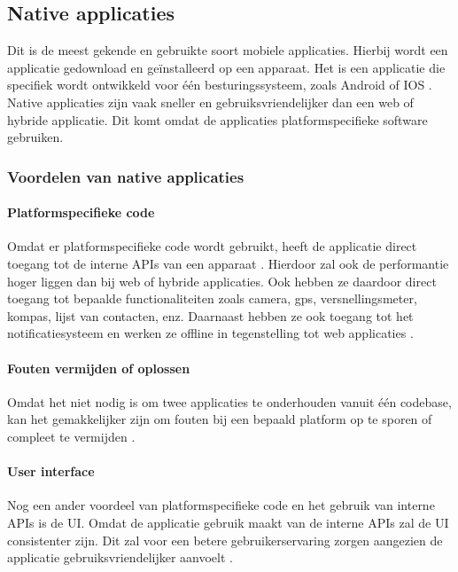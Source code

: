 \subsection{Native applicaties}\label{ch:native-applicaties}
Dit is de meest gekende en gebruikte soort mobiele applicaties. Hierbij wordt een applicatie 
gedownload en geïnstalleerd op een apparaat. Het is een applicatie die specifiek wordt ontwikkeld 
voor één besturingssysteem, zoals Android of IOS \autocite{Laarhoven2021}. Native applicaties 
zijn vaak sneller en gebruiksvriendelijker dan een web of hybride applicatie. Dit komt omdat 
de applicaties platformspecifieke software gebruiken. 

\subsubsection{Voordelen van native applicaties}
\label{ch:voordelen-native-applicaties}
\paragraph{Platformspecifieke code}
Omdat er platformspecifieke code wordt gebruikt, heeft de applicatie direct toegang tot 
de interne APIs van een apparaat \autocite{AWS2023}. Hierdoor zal ook de performantie hoger 
liggen dan bij web of hybride applicaties. Ook hebben ze daardoor direct toegang tot bepaalde 
functionaliteiten zoals camera, gps, versnellingsmeter, kompas, lijst van contacten, enz. 
Daarnaast hebben ze ook toegang tot het notificatiesysteem en werken ze offline in tegenstelling 
tot web applicaties \autocite{Budiu2016}. 

\paragraph{Fouten vermijden of oplossen}
Omdat het niet nodig is om twee applicaties te onderhouden vanuit één \gls{codebase}, kan 
het gemakkelijker zijn om fouten bij een bepaald platform op te sporen of compleet te 
vermijden \autocite{Koffer2023}. 

\paragraph{User interface}
Nog een ander voordeel van platformspecifieke code en het gebruik van interne APIs is de UI. 
Omdat de applicatie gebruik maakt van de interne APIs zal de UI consistenter zijn. 
Dit zal voor een betere gebruikerservaring zorgen aangezien de applicatie gebruiksvriendelijker 
aanvoelt \autocite{Kotlin2023}. 

